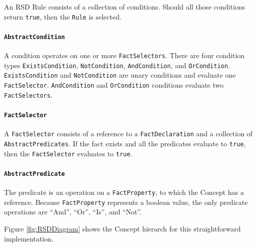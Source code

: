 An RSD Rule consists of a collection of conditions.
Should all those conditions return \texttt{true}, then the \texttt{Rule} is selected.

\paragraph{\texttt{AbstractCondition}} A condition operates on one or more \texttt{FactSelectors}.
There are four condition types \linebreak\texttt{ExistsCondition}, \texttt{NotCondition}, \texttt{AndCondition}, and \texttt{OrCondition}.
\texttt{ExistsCondition} and \texttt{NotCondition} are unary conditions and evaluate one \texttt{FactSelector}.
\texttt{AndCondition} and \texttt{OrCondition} conditions evaluate two \linebreak\texttt{FactSelectors}.

\paragraph{\texttt{FactSelector}} A \texttt{FactSelector} consists of a reference to a \texttt{FactDeclaration} and a collection of \linebreak\texttt{AbstractPredicates}.
If the fact exists and all the predicates evaluate to \texttt{true}, then the \texttt{FactSelector} evaluates to \texttt{true}.

\paragraph{\texttt{AbstractPredicate}} The predicate is an operation on a \texttt{FactProperty}, to which the Concept has a reference.
Because \texttt{FactProperty} represents a boolean value, the only predicate operations are ``And'', ``Or'', ``Is'', and ``Not''.

Figure \ref{fig:RSDDiagram} shows the Concept hierarch for this straightforward implementation.

